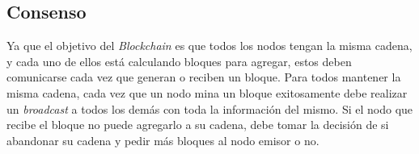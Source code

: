 \subsection{Consenso}
Ya que el objetivo del \textit{Blockchain} es que todos los nodos tengan la misma cadena, y cada uno de ellos está calculando bloques para agregar, estos deben comunicarse cada vez que generan o reciben un bloque. Para todos mantener la misma cadena, cada vez que un nodo mina un bloque exitosamente debe realizar un \textit{broadcast} a todos los demás con toda la información del mismo. Si el nodo que recibe el bloque no puede agregarlo a su cadena, 
debe tomar la decisión de si abandonar su cadena y pedir más bloques al nodo emisor o no. 















